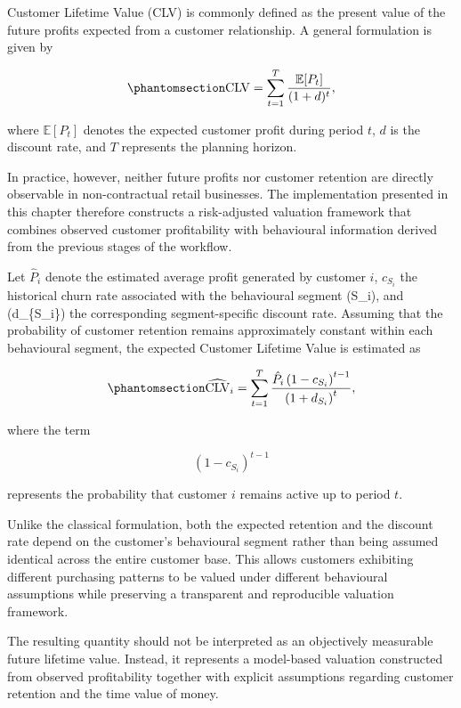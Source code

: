 \documentclass[
  12pt,
  letterpaper,
]{book}
\begin{document}
Customer Lifetime Value (CLV) is commonly defined as the present value
of the future profits expected from a customer relationship. A general
formulation is given by

\begin{equation}\phantomsection\label{eq-classical-clv}{
\mathrm{CLV}
=
\sum_{t=1}^{T}
\frac{\mathbb{E}[P_t]}
{(1+d)^t},
}\end{equation}

where \(\mathbb{E}[P_t]\) denotes the expected customer profit during
period \(t\), \(d\) is the discount rate, and \(T\) represents the
planning horizon.

In practice, however, neither future profits nor customer retention are
directly observable in non-contractual retail businesses. The
implementation presented in this chapter therefore constructs a
risk-adjusted valuation framework that combines observed customer
profitability with behavioural information derived from the previous
stages of the workflow.

Let \(\hat{P}_i\) denote the estimated average profit generated by
customer \(i\), \(c_{S_i}\) the historical churn rate associated with
the behavioural segment (S\_i), and (d\_\{S\_i\}) the corresponding
segment-specific discount rate. Assuming that the probability of
customer retention remains approximately constant within each
behavioural segment, the expected Customer Lifetime Value is estimated
as

\begin{equation}\phantomsection\label{eq-risk-adjusted-clv}{
\widehat{\mathrm{CLV}}_i
=
\sum_{t=1}^{T}
\frac{
\hat{P}_i
\left(1-c_{S_i}\right)^{t-1}
}
{\left(1+d_{S_i}\right)^t},
}\end{equation}

where the term

\[
\left(1-c_{S_i}\right)^{t-1}
\]

represents the probability that customer \(i\) remains active up to
period \(t\).

Unlike the classical formulation, both the expected retention and the
discount rate depend on the customer's behavioural segment rather than
being assumed identical across the entire customer base. This allows
customers exhibiting different purchasing patterns to be valued under
different behavioural assumptions while preserving a transparent and
reproducible valuation framework.

The resulting quantity should not be interpreted as an objectively
measurable future lifetime value. Instead, it represents a model-based
valuation constructed from observed profitability together with explicit
assumptions regarding customer retention and the time value of money.
\end{document}
